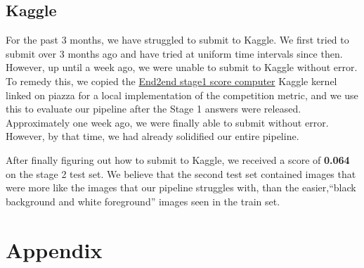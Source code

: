 \documentclass[paper=letter, fontsize=12pt]{article}
\newcommand\includeappendices{%
  \appendix
  \renewcommand{\thesection}{\Alph{section}}
  \section{Appendix}
  \the\mainnotetoks}
\numberwithin{equation}{section} %
\numberwithin{figure}{section} %
\numberwithin{table}{section} %
\begin{document}
\subsection{ Kaggle }

For the past 3 months, we have struggled to submit to Kaggle. We first tried to
submit over 3 months ago and have tried at uniform time intervals since then.
However, up until a week ago, we were unable to submit to Kaggle without error.
To remedy this, we copied the
\href{https://www.kaggle.com/zhujf553/end2end-stage1-score-computer/notebook}
{End2end stage1 score computer} Kaggle kernel linked on piazza for a local
implementation of the competition metric, and we use this to evaluate our
pipeline after the Stage 1 answers were released. Approximately one week ago,
we were finally able to submit without error. However, by that time, we had
already solidified our entire pipeline.

After finally figuring out how to submit to Kaggle, we received a score of
\textbf{0.064} on the stage 2 test set.  We believe that the second test set
contained images that were more like the images that our pipeline struggles
with, than the easier,``black background and white foreground'' images seen in 
the train set.

\newpage

\printbibliography

\newpage

\includeappendices
\end{document}
